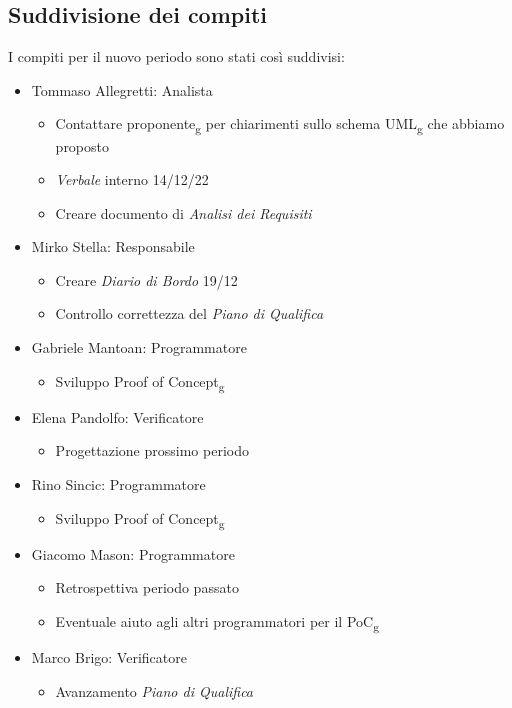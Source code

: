 \subsection{Suddivisione dei compiti}
I compiti per il nuovo periodo sono stati così suddivisi:
\begin{itemize}
	\item Tommaso Allegretti: Analista
	\begin{itemize}
		\item Contattare proponente\textsubscript{g} per chiarimenti sullo schema UML\textsubscript{g} che abbiamo proposto
		\item \textit{Verbale} interno 14/12/22
		\item Creare documento di \textit{Analisi dei Requisiti}
	\end{itemize}
	
	\item Mirko Stella: Responsabile
	\begin{itemize}
		\item Creare \textit{Diario di Bordo} 19/12
		\item Controllo correttezza del \textit{Piano di Qualifica}
	\end{itemize}
	
	\item Gabriele Mantoan: Programmatore
	\begin{itemize}
		\item Sviluppo Proof of Concept\textsubscript{g}
	\end{itemize}
	
	\item Elena Pandolfo: Verificatore
	\begin{itemize}
		\item Progettazione prossimo periodo
	\end{itemize}
	
	\item Rino Sincic: Programmatore
	\begin{itemize}
		\item Sviluppo Proof of Concept\textsubscript{g}
	\end{itemize}
	
	\item Giacomo Mason: Programmatore
	\begin{itemize}
		\item Retrospettiva periodo passato
		\item Eventuale aiuto agli altri programmatori per il PoC\textsubscript{g}
	\end{itemize}
	\item Marco Brigo: Verificatore
	\begin{itemize}
		\item Avanzamento \textit{Piano di Qualifica}
	\end{itemize}
\end{itemize}

